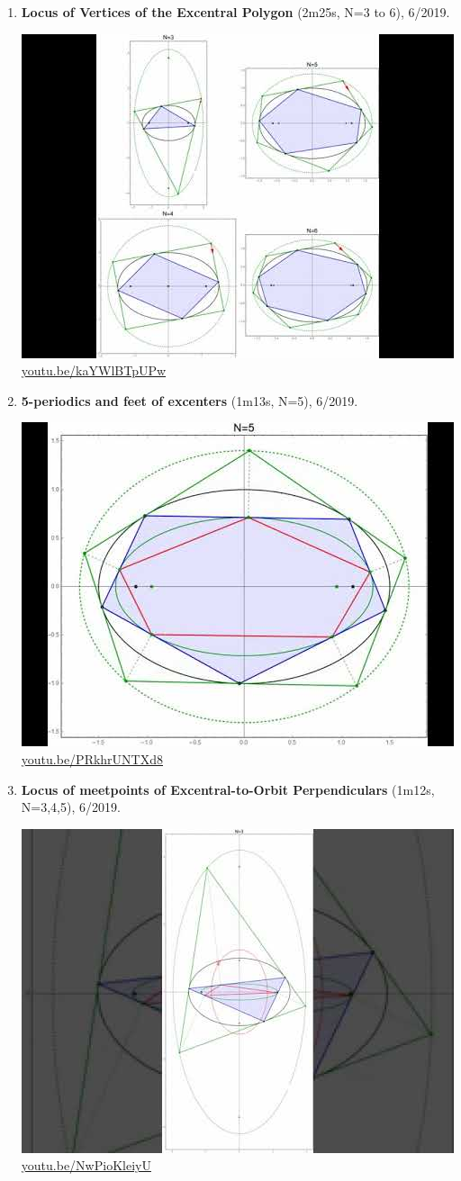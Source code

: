 \documentclass[12pt]{amsart}
\begin{document}
\begin{enumerate}[resume]
\item \textbf{Locus of Vertices of the Excentral Polygon} (2m25s, N=3 to 6), 6/2019. 
\begin{center}\includegraphics[width=.5\textwidth]{pics/kaYWlBTpUPw.jpg} \\ 
\href{https://youtu.be/kaYWlBTpUPw}{\url{youtu.be/kaYWlBTpUPw}}\end{center}
% 
\item \textbf{5-periodics and feet of excenters} (1m13s, N=5), 6/2019. 
\begin{center}\includegraphics[width=.5\textwidth]{pics/PRkhrUNTXd8.jpg} \\ 
\href{https://youtu.be/PRkhrUNTXd8}{\url{youtu.be/PRkhrUNTXd8}}\end{center}
% 
\item \textbf{Locus of meetpoints of Excentral-to-Orbit Perpendiculars} (1m12s, N=3,4,5), 6/2019. 
\begin{center}\includegraphics[width=.5\textwidth]{pics/NwPioKleiyU.jpg} \\ 
\href{https://youtu.be/NwPioKleiyU}{\url{youtu.be/NwPioKleiyU}}\end{center}
% 
\end{enumerate}
\end{document}

